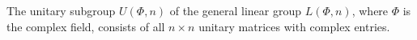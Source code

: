 The unitary subgroup $U(\Phi, n)$ of the general linear group $L(\Phi, n)$, where $\Phi$ is the complex field, consists of all $n \times n$ unitary matrices with complex entries.
